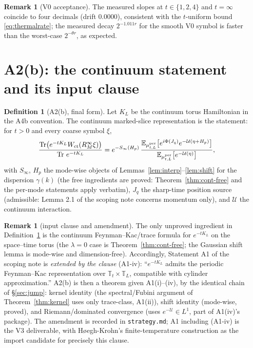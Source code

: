 \documentclass[11pt,a4paper]{article}
\theoremstyle{plain}
\theoremstyle{definition}
\newtheorem{definition}[theorem]{Definition}
\newtheorem{remark}[theorem]{Remark}
\newcommand{\T}{\mathbb{T}}
\newcommand{\E}{\mathbb{E}}
\DeclareMathOperator{\Trace}{Tr}
\begin{document}
\begin{remark}[V0 acceptance]
The measured slopes at $t\in\{1,2,4\}$ and $t=\infty$ coincide to four
decimals (drift $0.0000$), consistent with the $t$-uniform bound
\eqref{eq:thermalrate}; the measured decay $2^{-1.011r}$ for the smooth V0
symbol is faster than the worst-case $2^{-\theta r}$, as expected.
\end{remark}

\section{A2(b): the continuum statement and its input clause}\label{sec:A2b}

\begin{definition}[A2(b), final form]\label{def:A2b}
Let $K_L$ be the continuum torus Hamiltonian in the A4b convention. The
continuum marked-slice representation is the statement: for $t>0$ and every
coarse symbol $\xi$,
\[
 \frac{\Trace\bigl(e^{-tK_L}W_{\rm ct}(R_M^\infty\xi)\bigr)}
      {\Trace\,e^{-tK_L}}
 =e^{-S_\infty(H_p)}\,
 \frac{\E_{\mu^{\rm per}_{t,L}}
 \bigl[e^{i\Phi(J_q)}e^{-\mathcal U(\eta+H_p)}\bigr]}
      {\E_{\mu^{\rm per}_{t,L}}\bigl[e^{-\mathcal U(\eta)}\bigr]},
\]
with $S_\infty$, $H_p$ the mode-wise objects of
Lemmas~\ref{lem:interp}--\ref{lem:shift} for the dispersion $\gamma(k)$ (the
free ingredients are proved: Theorem~\ref{thm:cont-free} and the
per-mode statements apply verbatim), $J_q$ the sharp-time position source
(admissible: Lemma 2.1 of the scoping note concerns momentum only), and
$\mathcal U$ the continuum interaction.
\end{definition}

\begin{remark}[input clause and amendment]\label{rem:amendment}
The only unproved ingredient in Definition~\ref{def:A2b} is the continuum
Feynman--Kac/trace formula for $e^{-tK_L}$ on the space--time torus (the
$\lambda=0$ case is Theorem~\ref{thm:cont-free}; the Gaussian shift lemma is
mode-wise and dimension-free). Accordingly, Statement A1 of the scoping note
is \emph{extended by the clause} (A1-iv): ``$e^{-tK_L}$ admits the periodic
Feynman--Kac representation over $\T_t\times\T_L$, compatible with cylinder
approximation.'' A2(b) is then a theorem given A1(i)--(iv), by the identical
chain of \S\ref{sec:jump}: kernel identity (the spectral/Fubini argument of
Theorem~\ref{thm:kernel} uses only trace-class, A1(ii)), shift identity
(mode-wise, proved), and Riemann/dominated convergence (uses
$e^{-\mathcal U}\in L^1$, part of A1(iv)'s package). The amendment is recorded
in \texttt{strategy.md}; A1 including (A1-iv) is the V3 deliverable, with
H{\o}egh-Krohn's finite-temperature construction as the import candidate for
precisely this clause.
\end{remark}
\end{document}

